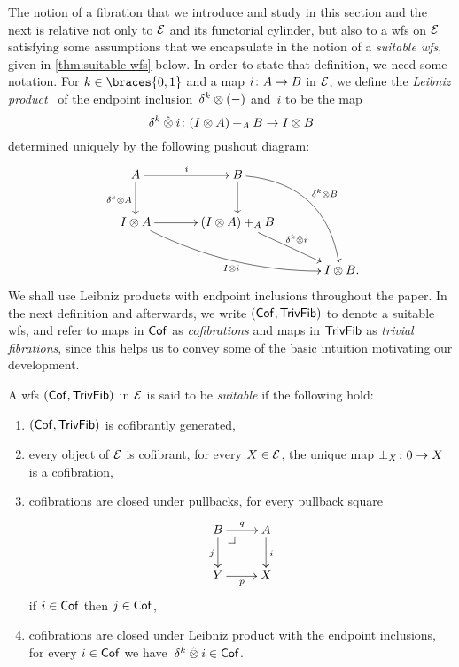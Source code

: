 \documentclass[reqno,10pt,a4paper,oneside,draft]{amsart}
\begin{document}
The notion of a fibration that we introduce and study in this section and the next is relative not only to $\cal{E}$ and its functorial cylinder, but also to a wfs on $\cal{E}$ satisfying some assumptions that we encapsulate in the notion of a \emph{suitable wfs}, given in \cref{thm:suitable-wfs} below.
In order to state that definition, we need some notation.
For $k \in \braces{0, 1}$ and a map $i \co A \to B$ in $\catE$, we define the \emph{Leibniz product}~\cite{riehl-verity:reedy} of the endpoint inclusion~$\kcyl \otimes (-)$ and~$i$ to be the map
\begin{equation}
\label{equ:leib-prod}
\kcyl \hatotimes i \co (\interval \otimes A) +_A B \to \interval \otimes B
\end{equation} 
determined uniquely by the following pushout diagram:
\begin{equation} \label{delta-otimes-definition}
\begin{gathered}
\xymatrix@C=1.2cm{
  A
  \ar[r]^{i}
  \ar[d]_{\kcyl \otimes A}
&
  B
  \ar@/^2pc/[ddr]^{\kcyl \otimes B}
  \ar[d]
&\\
  \interval \otimes A
  \ar@/_1pc/[drr]_{\interval \otimes i}
  \ar[r]
&
  (\interval \otimes A) +_A B
  \ar[dr]^-{\delta^k \hatotimes i}
&\\&&
  \interval \otimes B
\rlap{.}}
\end{gathered}
\end{equation}
We shall use Leibniz products with endpoint inclusions throughout the paper.
In the next definition and afterwards, we write $(\Cof, \TrivFib)$ to denote a suitable wfs, and refer to maps in $\Cof$ as \emph{cofibrations} and maps in $\TrivFib$ as \emph{trivial fibrations}, since this helps us to convey some of the basic intuition motivating our development.

\begin{definition} \label{thm:suitable-wfs}
A wfs $(\Cof, \TrivFib)$ in $\catE$ is said to be \emph{suitable} if the following hold:
\begin{enumerate}[({S}1)]
\item $(\Cof, \TrivFib)$ is cofibrantly generated,
\item every object of $\catE$ is cofibrant, \ie for every $X \in \cal{E}$, the unique map $\bot_X \co 0 \to X$ is a cofibration,
\item cofibrations are closed under pullbacks, \ie for every pullback square
\[
\xymatrix{
  B
  \ar[d]_j
  \ar[r]^q
  \pullback{dr}
&
  A
  \ar[d]^i
\\
  Y
  \ar[r]_p
&
  X
}
\]
if $i \in \Cof$ then $j \in \Cof$,
\item cofibrations are closed under Leibniz product with the endpoint inclusions, \ie for every $i \in \Cof$ we have~$\kcyl \hatotimes i \in \Cof$.
\end{enumerate}
\end{definition}
\end{document}
